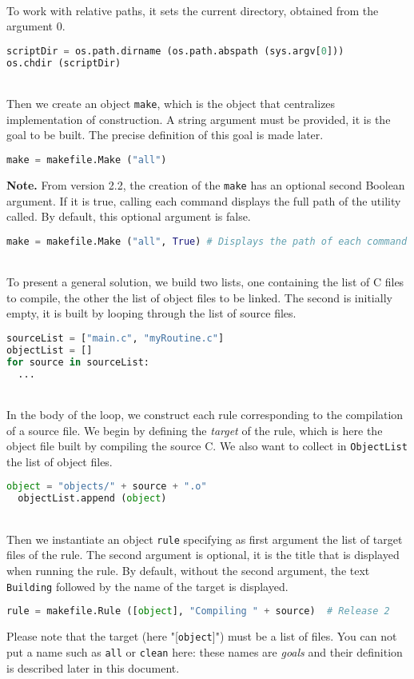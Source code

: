 \documentclass[a4paper,11pt]{extarticle}
\begin{document}
~\\To work with relative paths, it sets the current directory, obtained from the argument $0$.
\begin{lstlisting}[language=py]
scriptDir = os.path.dirname (os.path.abspath (sys.argv[0]))
os.chdir (scriptDir)
\end{lstlisting}

~\\Then we create an object \texttt{make}, which is the object that centralizes implementation of construction. A string argument must be provided, it is the goal to be built. The precise definition of this goal is made later.
\begin{lstlisting}[language=py]
make = makefile.Make ("all")
\end{lstlisting}

{\bf Note.}\label{logUtilityToolPath} From version 2.2, the creation of the \texttt{make} has an optional second Boolean argument. If it is true, calling each command displays the full path of the utility called. By default, this optional argument is false.
\begin{lstlisting}[language=py]
make = makefile.Make ("all", True) # Displays the path of each command called
\end{lstlisting}

~\\To present a general solution, we build two lists, one containing the list of C files to compile, the other the list of object files to be linked. The second is initially empty, it is built by looping through the list of source files. 
\begin{lstlisting}[language=py]
sourceList = ["main.c", "myRoutine.c"]
objectList = []
for source in sourceList:
  ...
\end{lstlisting}

~\\In the body of the loop, we construct each rule corresponding to the compilation of a source file. We begin by defining the \emph{target} of the rule, which is here the object file built by compiling the source C. We also want to collect in \texttt{ObjectList}  the list of object files.
\begin{lstlisting}[language=py]
  object = "objects/" + source + ".o"
  objectList.append (object)
\end{lstlisting}

~\\Then we instantiate an object \texttt{rule}  specifying as first argument the list of target files of the rule. The second argument is optional, it is the title that is displayed when running the rule. By default, without the second argument, the text \texttt{Building}  followed by the name of the target is displayed.
\begin{lstlisting}[language=py]
  rule = makefile.Rule ([object], "Compiling " + source)  # Release 2
\end{lstlisting}
Please note that the target (here "[\texttt{object}]") must be a list of files. You can not put a name such as \texttt{all} or \texttt{clean} here: these names are \emph{goals} and their definition is described later in this document.
\end{document}

